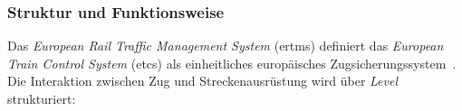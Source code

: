 \documentclass[runningheads]{res/llncs}
\begin{document}
\subsubsection{Struktur und Funktionsweise}
\label{sec:Struktur_und_Funktionsweise}
Das \textit{European Rail Traffic Management System} (\gls{ertms}) definiert das \textit{European Train Control System} (\gls{etcs}) als einheitliches europäisches Zugsicherungssystem~\parencite[S. 49]{trinckaufETCS2024}. Die Interaktion zwischen Zug und Streckenausrüstung wird über \textit{Level} strukturiert:

\end{document}
